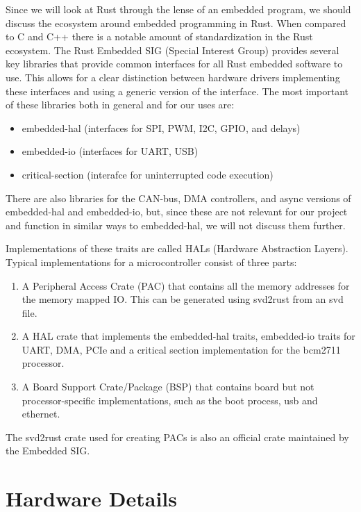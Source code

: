 Since we will look at Rust through the lense of an embedded program, we should discuss the ecosystem around embedded programming in Rust.
When compared to C and C++ there is a notable amount of standardization in the Rust ecosystem.
The Rust Embedded SIG (Special Interest Group) provides several key libraries that provide common interfaces for all Rust embedded software to use.
This allows for a clear distinction between hardware drivers implementing these interfaces and using a generic version of the interface.
The most important of these libraries both in general and for our uses are:
\begin{itemize}
    \item embedded-hal (interfaces for SPI, PWM, I2C, GPIO, and delays)
    \item embedded-io (interfaces for UART, USB)
    \item critical-section (interafce for uninterrupted code execution)
\end{itemize}

There are also libraries for the CAN-bus, DMA controllers, and async versions of embedded-hal and embedded-io,
but, since these are not relevant for our project and function in similar ways to embedded-hal,
we will not discuss them further.

Implementations of these traits are called HALs (Hardware Abstraction Layers).
Typical implementations for a microcontroller consist of three parts:
\begin{enumerate}
    \item A Peripheral Access Crate (PAC) that contains all the memory addresses for the memory mapped IO. This can be generated using svd2rust from an svd file.
    \item A HAL crate that implements the embedded-hal traits, embedded-io traits for UART, DMA, PCIe and a critical section implementation for the bcm2711 processor.
    \item A Board Support Crate/Package (BSP) that contains board but not processor-specific implementations, such as the boot process, usb and ethernet.
\end{enumerate}

The svd2rust crate used for creating PACs is also an official crate maintained by the Embedded SIG.

\section{Hardware Details}
\label{sec:background:hardware}

